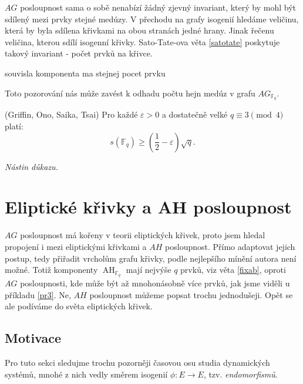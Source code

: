 \documentclass[12pt]{report}
\DeclareMathOperator{\AH}{AH}
\begin{document}
$AG$ posloupnost sama o sobě nenabízí žádný zjevný invariant, který by mohl být sdílený mezi prvky stejné medúzy. V přechodu na grafy isogenií hledáme veličinu, která by byla sdílena křivkami na obou stranách jedné hrany. Jinak řečenu veličina, kterou sdílí isogenní křivky. Sato-Tate-ova věta \ref{satotate} poskytuje takový invariant - počet prvků na křivce. 

\begin{veta}
souvisla komponenta ma stejnej pocet prvku
\end{veta}


Toto pozorování nás může zavést k odhadu počtu hejn medúz v grafu $AG_{\mathbb{F}_q}$.


\begin{veta}(Griffin, Ono, Saika, Tsai)
Pro každé $\varepsilon>0$ a dostatečně velké $q \equiv 3 \pmod{4}$ platí:
$$s(\mathbb{F}_q) \geqslant \left(\frac{1}{2} - \varepsilon \right) \sqrt{q}.$$
\end{veta}
\noindent \textit{Nástin důkazu.}



\chapter{Eliptické křivky a AH posloupnost}\label{5}

$AG$ posloupnost má kořeny v teorii eliptických křivek, proto jsem hledal propojení i mezi eliptickými křivkami a $AH$ posloupnost.
Přímo adaptovat jejich postup, tedy přiřadit vrcholům grafu křivky, podle nejlepšího mínění autora není možné. Totiž komponenty $\AH_{\mathbb{F}_q}$ mají nejvýše $q$ prvků, viz věta \ref{fixab}, oproti $AG$ posloupnosti, kde může být až mnohonásobně více prvků, jak jsme viděli u příkladu \ref{pr3}. Ne, $AH$ posloupnost můžeme popsat trochu jednodušeji. Opět se ale podíváme do světa eliptických křivek. 

\section{Motivace}

Pro tuto sekci sledujme trochu pozorněji časovou osu studia dynamických systémů, mnohé z nich vedly směrem isogenií $\phi : E \longrightarrow E$, tzv. \textit{endomorfismů}.
\end{document}
